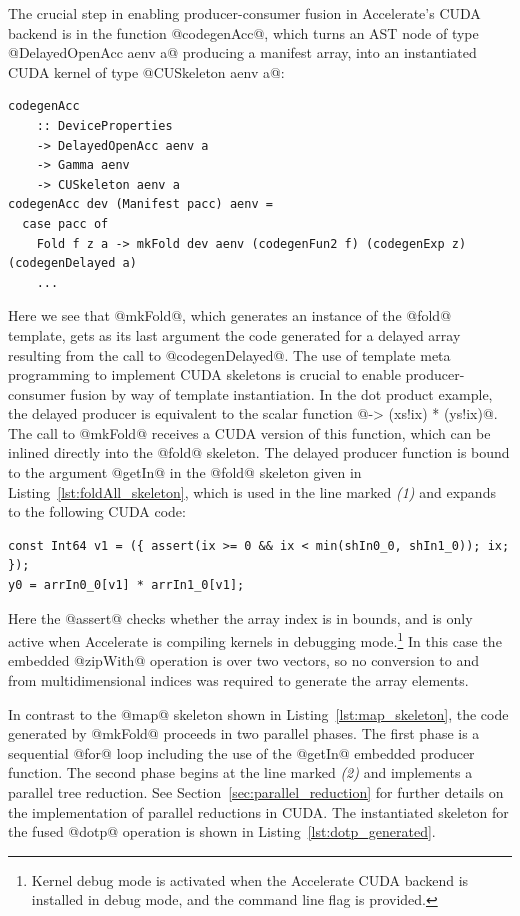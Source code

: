 The crucial step in enabling producer-consumer fusion in Accelerate's CUDA
backend is in the function @codegenAcc@, which turns an AST node of type
@DelayedOpenAcc aenv a@ producing a manifest array, into an instantiated CUDA
kernel of type @CUSkeleton aenv a@:
%
\begin{lstlisting}[style=haskell]
codegenAcc
    :: DeviceProperties
    -> DelayedOpenAcc aenv a
    -> Gamma aenv
    -> CUSkeleton aenv a
codegenAcc dev (Manifest pacc) aenv =
  case pacc of
    Fold f z a -> mkFold dev aenv (codegenFun2 f) (codegenExp z) (codegenDelayed a)
    ...
\end{lstlisting}
%
Here we see that @mkFold@, which generates an instance of the @fold@
template, gets as its last argument the code generated for a delayed array
resulting from the call to @codegenDelayed@. The use of template meta
programming to implement CUDA skeletons is crucial to enable producer-consumer
fusion by way of template instantiation. In the dot product example, the delayed
producer is equivalent to the scalar function @\ix -> (xs!ix) * (ys!ix)@.
The call to @mkFold@ receives a CUDA version of this function, which can be
inlined directly into the @fold@ skeleton. The delayed producer function is
bound to the argument @getIn@ in the @fold@ skeleton given in
Listing~\ref{lst:foldAll_skeleton}, which is used in the line marked \emph{(1)} and
expands to the following CUDA code:
%
\begin{lstlisting}[style=haskell]
const Int64 v1 = ({ assert(ix >= 0 && ix < min(shIn0_0, shIn1_0)); ix; });
y0 = arrIn0_0[v1] * arrIn1_0[v1];
\end{lstlisting}
%
Here the @assert@ checks whether the array index is in bounds, and is only
active when Accelerate is compiling kernels in debugging mode.\footnote{Kernel
debug mode is activated when the Accelerate CUDA backend is installed in debug
mode, and the command line flag  is provided.} In this case the
embedded @zipWith@ operation is over two vectors, so no conversion to and
from multidimensional indices was required to generate the array elements.

In contrast to the @map@ skeleton shown in Listing~\ref{lst:map_skeleton}, the
code generated by @mkFold@ proceeds in two parallel phases. The first phase is a
sequential @for@ loop including the use of the @getIn@ embedded producer
function. The second phase begins at the line marked \emph{(2)} and implements a
parallel tree reduction. See Section~\ref{sec:parallel_reduction} for further
details on the implementation of parallel reductions in CUDA. The instantiated
skeleton for the fused @dotp@ operation is shown in
Listing~\ref{lst:dotp_generated}.


